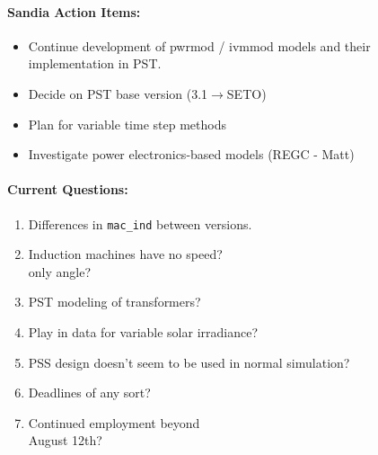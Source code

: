 \documentclass[12pt]{article}
\begin{document}
\begin{multicols}{2}
\paragraph{Sandia Action Items:}
	\begin{itemize}
		\itemsep 0em 
			\item Continue development of pwrmod / ivmmod models and their implementation in PST.
			\item Decide on PST base version (3.1$\longrightarrow$SETO)
			\item Plan for variable time step methods
			\item Investigate power electronics-based models (REGC - Matt)
	\end{itemize}
	
\paragraph{Current Questions:}
	\begin{enumerate}
	\itemsep0em 
	
		\item Differences in \verb|mac_ind| between versions.
	\item Induction machines have no speed?\\ only angle?
	\item PST modeling of transformers?
	\item Play in data for variable solar irradiance?
	\item PSS design doesn't seem to be used in normal simulation?
	\item Deadlines of any sort?
	\item Continued employment beyond \\August 12th?
	\end{enumerate}

\vfill\null
\columnbreak

	

\end{multicols}
\end{document}
